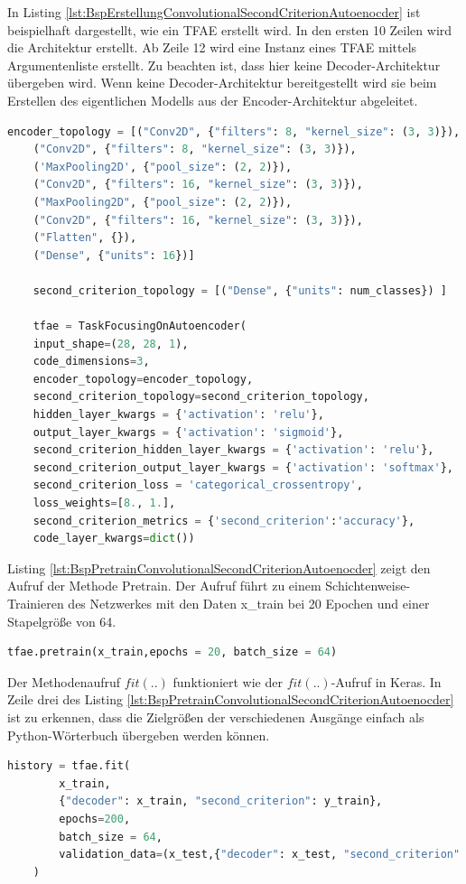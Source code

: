 	In Listing \ref{lst:BspErstellungConvolutionalSecondCriterionAutoenocder} ist beispielhaft dargestellt, wie ein TFAE erstellt wird. In den ersten 10 Zeilen wird die Architektur erstellt. Ab Zeile 12 wird eine Instanz eines TFAE mittels Argumentenliste erstellt. Zu beachten ist, dass hier keine Decoder-Architektur übergeben wird. Wenn keine Decoder-Architektur bereitgestellt wird sie beim Erstellen des eigentlichen Modells aus der Encoder-Architektur abgeleitet.
	\begin{lstlisting}[language=python,caption=Beispiel Erstellung ConvolutionalSecondCriterionAutoenocder in Python, label=lst:BspErstellungConvolutionalSecondCriterionAutoenocder]
	encoder_topology = [("Conv2D", {"filters": 8, "kernel_size": (3, 3)}),
	("Conv2D", {"filters": 8, "kernel_size": (3, 3)}),
	('MaxPooling2D', {"pool_size": (2, 2)}),
	("Conv2D", {"filters": 16, "kernel_size": (3, 3)}),
	("MaxPooling2D", {"pool_size": (2, 2)}),
	("Conv2D", {"filters": 16, "kernel_size": (3, 3)}),
	("Flatten", {}),
	("Dense", {"units": 16})]

	second_criterion_topology = [("Dense", {"units": num_classes}) ]

	tfae = TaskFocusingOnAutoencoder(
	input_shape=(28, 28, 1),	
	code_dimensions=3, 
	encoder_topology=encoder_topology,
	second_criterion_topology=second_criterion_topology,
	hidden_layer_kwargs = {'activation': 'relu'},
	output_layer_kwargs = {'activation': 'sigmoid'},
	second_criterion_hidden_layer_kwargs = {'activation': 'relu'},
	second_criterion_output_layer_kwargs = {'activation': 'softmax'},
	second_criterion_loss = 'categorical_crossentropy',
	loss_weights=[8., 1.],
	second_criterion_metrics = {'second_criterion':'accuracy'},
	code_layer_kwargs=dict())
	\end{lstlisting}
	Listing  \ref{lst:BspPretrainConvolutionalSecondCriterionAutoenocder}  zeigt den Aufruf der Methode Pretrain. Der Aufruf führt zu einem Schichtenweise-Trainieren des Netzwerkes mit den Daten x\_train bei 20 Epochen und einer Stapelgröße von 64. 
	\begin{lstlisting}[language=python,caption=Beispielaufruf Pretrain  in Python, label=lst:BspPretrainConvolutionalSecondCriterionAutoenocder]
	tfae.pretrain(x_train,epochs = 20, batch_size = 64)
	\end{lstlisting}

	Der Methodenaufruf $fit(..)$ funktioniert wie der $fit(..)$-Aufruf in Keras. In Zeile drei des Listing  \ref{lst:BspPretrainConvolutionalSecondCriterionAutoenocder}  ist zu erkennen, dass die Zielgrößen der verschiedenen Ausgänge einfach als Python-Wörterbuch übergeben werden können.
	\begin{lstlisting}[language=python,caption=Beispielaufruf Fit  in Python, label=lst:BspFitConvolutionalSecondCriterionAutoenocder]
	history = tfae.fit(
		x_train,
		{"decoder": x_train, "second_criterion": y_train}, 
		epochs=200,
		batch_size = 64,
		validation_data=(x_test,{"decoder": x_test, "second_criterion": y_test})
	)
	\end{lstlisting}

